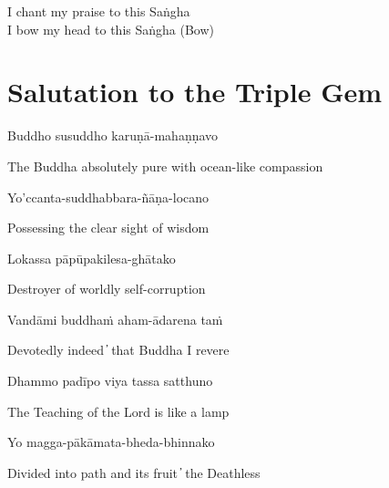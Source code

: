 \begin{cprenglish}
I chant my praise to this Saṅgha\\
I bow my head to this Saṅgha (Bow)
\end{cprenglish}


\section*{Salutation to the Triple Gem}

\begin{leader}
\end{leader}
\begin{leader}
\end{leader}


Buddho susuddho karuṇā-mahaṇṇavo

\begin{cprenglish}
The Buddha absolutely pure with ocean-like compassion
\end{cprenglish}

Yo'ccanta-suddhabbara-ñāṇa-locano

\begin{cprenglish}
Possessing the clear sight of wisdom
\end{cprenglish}

Lokassa pāpūpakilesa-ghātako

\begin{cprenglish}
Destroyer of worldly self-corruption
\end{cprenglish}

Vandāmi buddhaṁ aham-ādarena taṁ

\begin{cprenglish}
Devotedly indeed  ̓  that Buddha I revere
\end{cprenglish}

Dhammo padīpo viya tassa satthuno

\begin{cprenglish}
The Teaching of the Lord is like a lamp
\end{cprenglish}

Yo magga-pākāmata-bheda-bhinnako

\begin{cprenglish}
Divided into path and its fruit  ̓  the Deathless
\end{cprenglish}

